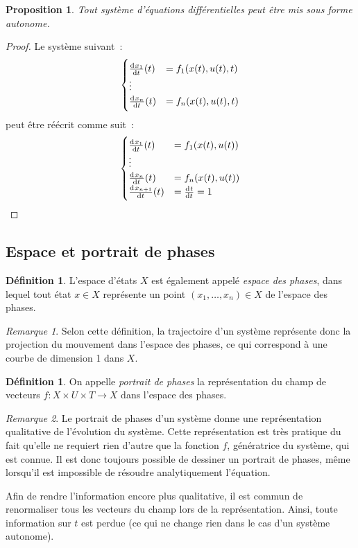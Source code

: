 \documentclass{article}
\newtheorem{prp}[thm]{Proposition}
\theoremstyle{definition}
\newtheorem{déf}[thm]{Définition}
\theoremstyle{remark}
\newtheorem*{rmq}{Remarque}
\begin{document}
	\begin{prp} Tout système d'équations différentielles peut être mis sous forme autonome.
	\end{prp}

	\begin{proof} Le système suivant~:
	\[\begin{cases}
		\od {x_1}t(t) &= f_1(x(t), u(t), t) \\
		\vdots \\
		\od {x_n}t(t) &= f_n(x(t), u(t), t)
	\end{cases}\]
	peut être réécrit comme suit~:
	\[\begin{cases}
		\od {x_1}t(t) &= f_1(x(t), u(t)) \\
		\vdots \\
		\od {x_n}t(t) &= f_n(x(t), u(t)) \\
		\od {x_{n+1}}t(t) &= \od tt = 1
	\end{cases}\]
	\end{proof}

	\subsection{Espace et portrait de phases}

	\begin{déf} L'espace d'états $X$ est également appelé \textit{espace des phases}, dans lequel tout état $x \in X$ représente un point $(x_1, \ldots, x_n) \in X$
	de l'espace des phases.
	\end{déf}

	\begin{rmq} Selon cette définition, la trajectoire d'un système représente donc la projection du mouvement dans l'espace des phases, ce qui correspond à
	une courbe de dimension 1 dans $X$.
	\end{rmq}

	\begin{déf} On appelle \textit{portrait de phases} la représentation du champ de vecteurs $f : X \times U \times T \to X$ dans l'espace des phases.
	\end{déf}

	\begin{rmq} Le portrait de phases d'un système donne une représentation qualitative de l'évolution du système. Cette représentation est très pratique du fait
	qu'elle ne requiert rien d'autre que la fonction $f$, génératrice du système, qui est connue. Il est donc toujours possible de dessiner un portrait de phases,
	même lorsqu'il est impossible de résoudre analytiquement l'équation.

	Afin de rendre l'information encore plus qualitative, il est commun de renormaliser tous les vecteurs du champ lors de la représentation. Ainsi, toute
	information sur $t$ est perdue (ce qui ne change rien dans le cas d'un système autonome).
	\end{rmq}
\end{document}
